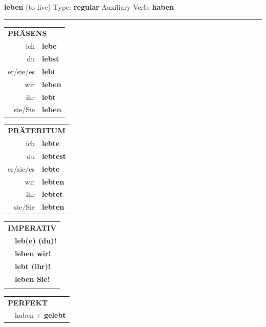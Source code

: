 \documentclass[10pt,a4paper]{revtex4-2}
\begin{document}
\begin{verbbox}
    {\Large \bf leben} (to live) \hfill Type: \textbf{regular} \hfill Auxiliary Verb: \textbf{haben} 
    
     \vspace{5pt}

    \hrule
    
    \vspace{5pt}

  \begin{tabular}{rl}
     \multicolumn{2}{l}{\textbf{PRÄSENS} }\\
    ich & \textbf{lebe}\\
    du & \textbf{lebst}\\
    er/sie/es & \textbf{lebt}\\
    wir & \textbf{leben}\\
    ihr & \textbf{lebt}\\
    sie/Sie & \textbf{leben}\\
  \end{tabular}
  \hfill
     \begin{tabular}{rl}
    \multicolumn{2}{l}{\textbf{PRÄTERITUM} }\\
    ich & \textbf{lebte}\\
    du & \textbf{lebtest}\\
    er/sie/es & \textbf{lebte}\\
    wir & \textbf{lebten}\\
    ihr & \textbf{lebtet}\\
    sie/Sie & \textbf{lebten}\\
  \end{tabular}
  \hfill
  \begin{tabular}{rl}
     \multicolumn{2}{l}{\textbf{IMPERATIV} }\\
   & \textbf{leb(e) (du)!}\\
   & \textbf{leben wir!}\\
   & \textbf{lebt (ihr)!}\\
   & \textbf{leben Sie!}\\
   & \vspace{10pt}
  \end{tabular}

    \vspace{10pt}

 \begin{tabular}{rl}
     \multicolumn{2}{l}{\textbf{PERFEKT}}\\
   & haben + \textbf{gelebt}\\
  \end{tabular}
\hfill
   \begin{tabular}{rl}
   

\end{tabular}
\end{verbbox}
\end{document}
